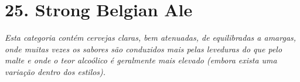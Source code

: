 \section*{25. Strong Belgian Ale}
\textit{Esta categoria contém cervejas claras, bem atenuadas, de equilibradas a amargas, onde muitas vezes os sabores são conduzidos mais pelas leveduras do que pelo malte e onde o teor alcoólico é geralmente mais elevado (embora exista uma variação dentro dos estilos).}